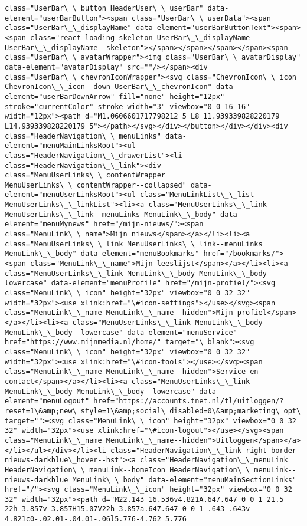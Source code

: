 \documentclass[11pt]{article}
\begin{document}
\begin{Verbatim}[commandchars=\\\{\}]
class="UserBar\_\_button HeaderUser\_\_userBar" data-element="userBarButton"><span class="UserBar\_\_userData"><span class="UserBar\_\_displayName" data-element="userBarButtonText"><span><span class="react-loading-skeleton UserBar\_\_displayName UserBar\_\_displayName--skeleton">‌</span></span></span></span><span class="UserBar\_\_avatarWrapper"><img class="UserBar\_\_avatarDisplay" data-element="avatarDisplay" src=""/></span><div class="UserBar\_\_chevronIconWrapper"><svg class="ChevronIcon\_\_icon ChevronIcon\_\_icon--down UserBar\_\_chevronIcon" data-element="userBarDownArrow" fill="none" height="12px" stroke="currentColor" stroke-width="3" viewbox="0 0 16 16" width="12px"><path d="M1.0606601717798212 5 L8 11.939339828220179 L14.939339828220179 5"></path></svg></div></button></div></div><div class="HeaderNavigation\_\_menuLinks" data-element="menuMainLinksRoot"><ul class="HeaderNavigation\_\_drawerList"><li class="HeaderNavigation\_\_link"><div class="MenuUserLinks\_\_contentWrapper MenuUserLinks\_\_contentWrapper--collapsed" data-element="menuUserLinksRoot"><ul class="MenuLinkList\_\_list MenuUserLinks\_\_linkList"><li><a class="MenuUserLinks\_\_link MenuUserLinks\_\_link--menuLinks MenuLink\_\_body" data-element="menuMynews" href="/mijn-nieuws/"><span class="MenuLink\_\_name">Mijn nieuws</span></a></li><li><a class="MenuUserLinks\_\_link MenuUserLinks\_\_link--menuLinks MenuLink\_\_body" data-element="menuBookmarks" href="/bookmarks/"><span class="MenuLink\_\_name">Mijn leeslijst</span></a></li><li><a class="MenuUserLinks\_\_link MenuLink\_\_body MenuLink\_\_body--lowercase" data-element="menuProfile" href="/mijn-profiel/"><svg class="MenuLink\_\_icon" height="32px" viewbox="0 0 32 32" width="32px"><use xlink:href="\#icon-settings"></use></svg><span class="MenuLink\_\_name MenuLink\_\_name--hidden">Mijn profiel</span></a></li><li><a class="MenuUserLinks\_\_link MenuLink\_\_body MenuLink\_\_body--lowercase" data-element="menuService" href="https://www.mijnmedia.nl/home/" target="\_blank"><svg class="MenuLink\_\_icon" height="32px" viewbox="0 0 32 32" width="32px"><use xlink:href="\#icon-tools"></use></svg><span class="MenuLink\_\_name MenuLink\_\_name--hidden">Service en contact</span></a></li><li><a class="MenuUserLinks\_\_link MenuLink\_\_body MenuLink\_\_body--lowercase" data-element="menuLogout" href="https://accounts.tnet.nl/tl/uitloggen/?reset=1\&amp;new\_style=1\&amp;social\_disabled=0\&amp;marketing\_opt\_in=1\&amp;redirect\_url=https\%3A\%2F\%2Fwww.telegraaf.nl\%2Faccounts\%2Flogout\%3FreturnTo\%3D\%252F" target=""><svg class="MenuLink\_\_icon" height="32px" viewbox="0 0 32 32" width="32px"><use xlink:href="\#icon-logout"></use></svg><span class="MenuLink\_\_name MenuLink\_\_name--hidden">Uitloggen</span></a></li></ul></div></li><li class="HeaderNavigation\_\_link right-border-nieuws-darkblue\_hover--hst"><a class="HeaderNavigation\_\_menuLink HeaderNavigation\_\_menuLink--homeIcon HeaderNavigation\_\_menuLink--nieuws-darkblue MenuLink\_\_body" data-element="menuMainSectionLinks" href="/"><svg class="MenuLink\_\_icon" height="32px" viewbox="0 0 32 32" width="32px"><path d="M22.143 16.536v4.821A.647.647 0 0 1 21.5 22h-3.857v-3.857H15.07V22h-3.857a.647.647 0 0 1-.643-.643v-4.821c0-.02.01-.04.01-.06l5.776-4.762 5.776 
\end{Verbatim}
\end{document}
